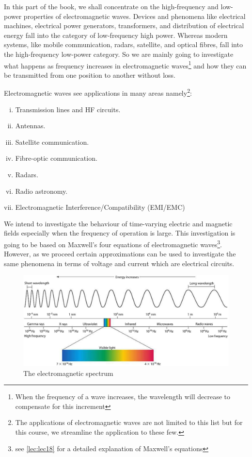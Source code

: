 In this part of the book, we shall concentrate on the high-frequency and low-power properties of electromagnetic waves. Devices and phenomena like electrical machines, electrical power generators, transformers, and distribution of electrical energy fall into the category of low-frequency high power. Whereas modern systems, like mobile communication, radars, satellite, and optical fibres, fall into the high-frequency low-power category. So we are mainly going to investigate what happens as frequency increases in electromagnetic waves\footnote{
When the frequency of a wave increases, the wavelength will decrease to compensate for this increment
} and how they can be transmitted from one position to another without loss.

Electromagnetic waves see applications in many areas namely\footnote{
The applications of electromagnetic waves are not limited to this list but for this course, we streamline the application to these few.
}:
\begin{enumerate}[(i)]
\item Transmission lines and HF circuits.
\item Antennas.
\item Satellite communication.
\item Fibre-optic communication.
\item Radars.
\item Radio astronomy.
\item Electromagnetic Interference/Compatibility (EMI/EMC)
\end{enumerate}

We intend to investigate the behaviour of time-varying electric and magnetic fields especially when the frequency of operation is large. This investigation is going to be based on Maxwell's four equations of electromagnetic waves\footnote{
see \autoref{lec:lec18} for a detailed explanation of Maxwell's equations
}. However, as we proceed certain approximations can be used to investigate the same phenomena in terms of voltage and current which are electrical circuits.

\begin{figure}[h]
\centering
\includegraphics[width=1\linewidth]{./graphics/electromagneticspectrum}
\caption{The electromagnetic spectrum}
\label{fig:electromagneticspectrum}
\end{figure}

